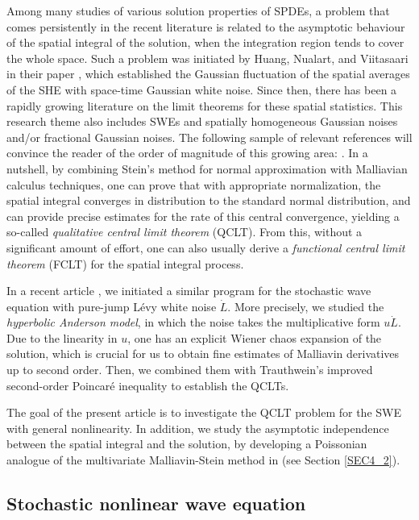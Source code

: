 \documentclass[letterpaper, 11pt,  reqno]{amsart}
\numberwithin{equation}{section}
\numberwithin{theorem}{section}
\begin{document}
Among   many studies of various solution properties of SPDEs, a problem that comes persistently
in the recent literature is related to the asymptotic behaviour of the spatial integral of the solution, when the integration region tends to cover the whole space. 
Such a problem was initiated by   Huang, Nualart, and Viitasaari in their paper \cite{HNV},
which established the Gaussian fluctuation of the spatial averages of the SHE with
space-time Gaussian white noise. Since then, there has been a rapidly growing literature 
on the limit theorems for these spatial statistics. This research theme also includes
 SWEs and spatially homogeneous Gaussian noises and/or fractional Gaussian noises. 
 The following sample of relevant references will convince the reader of the order of magnitude of this growing area: \cite{HNVZ, DNZ20,  BNZ,   BNQSZ,  CKNP22, CKNPjfa,  NZ20a, NZ20b,  NSZ21, NZ22, NXZ22, PU22, Ebina23a, Ebina23b}. In a nutshell, by combining Stein's method for normal approximation with Malliavian calculus techniques, one can prove that with appropriate normalization, the spatial integral converges in distribution to the standard normal distribution, and can provide precise estimates for the rate of this central convergence, yielding a so-called {\em qualitative central limit theorem} (QCLT). From this, without a significant amount of effort, one can
 also  usually derive   a {\em functional central limit theorem} (FCLT) for the spatial integral process.

In a recent article \cite{BZ23}, we initiated a similar program 
for the stochastic wave equation with pure-jump L\'evy white noise $\dot{L}$. 
More precisely, we  studied the {\em hyperbolic Anderson model},  in which the noise
takes the multiplicative form $u \dot{L}$. Due to the linearity in $u$, one has 
an explicit Wiener chaos expansion of the solution, which is crucial 
for us to obtain fine estimates of Malliavin derivatives up to second order. 
Then, we combined them with Trauthwein's improved second-order 
Poincar\'e inequality \cite{Tara} to establish the QCLTs.


The goal of the present article is to investigate  the QCLT problem for the SWE with general nonlinearity. In addition, we study the asymptotic independence between the spatial integral and the solution, by developing a Poissonian  analogue of the multivariate Malliavin-Stein method  in \cite{tudor23} (see Section \ref{SEC4_2}).




\subsection{Stochastic nonlinear wave equation}
\end{document}
